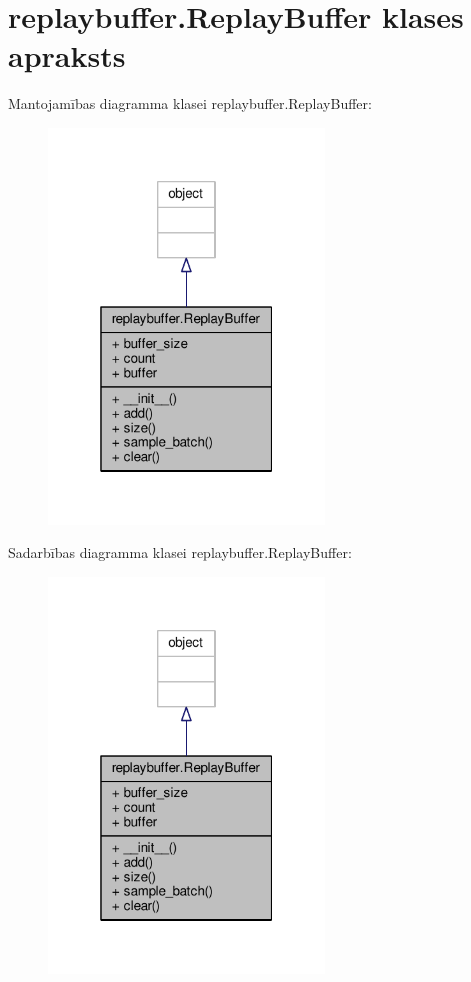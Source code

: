 \hypertarget{classreplaybuffer_1_1_replay_buffer}{}\section{replaybuffer.\+Replay\+Buffer klases apraksts}
\label{classreplaybuffer_1_1_replay_buffer}


Mantojamības diagramma klasei replaybuffer.\+Replay\+Buffer\+:
\nopagebreak
\begin{figure}[H]
\begin{center}
\leavevmode
\includegraphics[width=208pt]{classreplaybuffer_1_1_replay_buffer__inherit__graph}
\end{center}
\end{figure}


Sadarbības diagramma klasei replaybuffer.\+Replay\+Buffer\+:
\nopagebreak
\begin{figure}[H]
\begin{center}
\leavevmode
\includegraphics[width=208pt]{classreplaybuffer_1_1_replay_buffer__coll__graph}
\end{center}
\end{figure}

